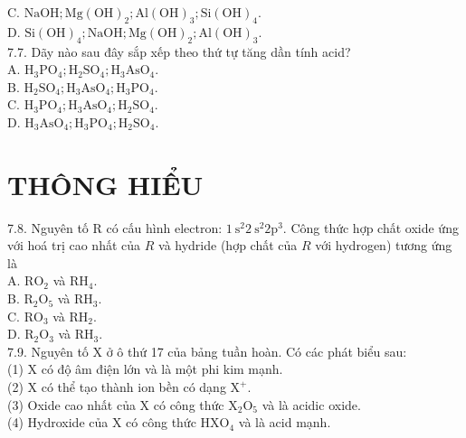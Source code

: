 \documentclass[10pt]{article}
\begin{document}
C. $\mathrm{NaOH} ; \mathrm{Mg}(\mathrm{OH})_{2} ; \mathrm{Al}(\mathrm{OH})_{3} ; \mathrm{Si}(\mathrm{OH})_{4}$.\\
D. $\mathrm{Si}(\mathrm{OH})_{4} ; \mathrm{NaOH} ; \mathrm{Mg}(\mathrm{OH})_{2} ; \mathrm{Al}(\mathrm{OH})_{3}$.\\
7.7. Dãy nào sau đây sắp xếp theo thứ tự tăng dần tính acid?\\
A. $\mathrm{H}_{3} \mathrm{PO}_{4} ; \mathrm{H}_{2} \mathrm{SO}_{4} ; \mathrm{H}_{3} \mathrm{AsO}_{4}$.\\
B. $\mathrm{H}_{2} \mathrm{SO}_{4} ; \mathrm{H}_{3} \mathrm{AsO}_{4} ; \mathrm{H}_{3} \mathrm{PO}_{4}$.\\
C. $\mathrm{H}_{3} \mathrm{PO}_{4} ; \mathrm{H}_{3} \mathrm{AsO}_{4} ; \mathrm{H}_{2} \mathrm{SO}_{4}$.\\
D. $\mathrm{H}_{3} \mathrm{AsO}_{4} ; \mathrm{H}_{3} \mathrm{PO}_{4} ; \mathrm{H}_{2} \mathrm{SO}_{4}$.

\section*{THÔNG HIỂU}
7.8. Nguyên tố R có cấu hình electron: $1 \mathrm{~s}^{2} 2 \mathrm{~s}^{2} 2 \mathrm{p}^{3}$. Công thức hợp chất oxide ứng với hoá trị cao nhất của $R$ và hydride (hợp chất của $R$ với hydrogen) tương ứng là\\
A. $\mathrm{RO}_{2}$ và $\mathrm{RH}_{4}$.\\
B. $\mathrm{R}_{2} \mathrm{O}_{5}$ và $\mathrm{RH}_{3}$.\\
C. $\mathrm{RO}_{3}$ và $\mathrm{RH}_{2}$.\\
D. $\mathrm{R}_{2} \mathrm{O}_{3}$ và $\mathrm{RH}_{3}$.\\
7.9. Nguyên tố X ở ô thứ 17 của bảng tuần hoàn. Có các phát biểu sau:\\
(1) X có độ âm điện lớn và là một phi kim mạnh.\\
(2) X có thể tạo thành ion bền có dạng $\mathrm{X}^{+}$.\\
(3) Oxide cao nhất của X có công thức $\mathrm{X}_{2} \mathrm{O}_{5}$ và là acidic oxide.\\
(4) Hydroxide của X có công thức $\mathrm{HXO}_{4}$ và là acid mạnh.
\end{document}
